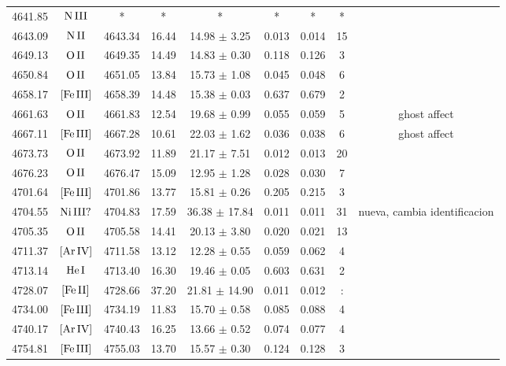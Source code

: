 \documentclass{article}
\begin{document}
\begin{table*}
\begin{adjustbox}{width=\textwidth}
\begin{tabular}{ccccccccc}
4641.85 & $\mbox{N}\thinspace \mbox{III}$ & * & * & * & * & * & * &  \\
4643.09 & $\mbox{N}\thinspace \mbox{II}$ & 4643.34 & 16.44 & 14.98 $\pm$ 3.25 & 0.013 & 0.014 & 15 &  \\
4649.13 & $\mbox{O}\thinspace \mbox{II}$ & 4649.35 & 14.49 & 14.83 $\pm$ 0.30 & 0.118 & 0.126 & 3 &  \\
4650.84 & $\mbox{O}\thinspace \mbox{II}$ & 4651.05 & 13.84 & 15.73 $\pm$ 1.08 & 0.045 & 0.048 & 6 &  \\
4658.17 & $\mbox{[Fe}\thinspace \mbox{III]}$ & 4658.39 & 14.48 & 15.38 $\pm$ 0.03 & 0.637 & 0.679 & 2 &  \\
4661.63 & $\mbox{O}\thinspace \mbox{II}$ & 4661.83 & 12.54 & 19.68 $\pm$ 0.99 & 0.055 & 0.059 & 5 &  ghost affect \\
4667.11 & $\mbox{[Fe}\thinspace \mbox{III]}$ & 4667.28 & 10.61 & 22.03 $\pm$ 1.62 & 0.036 & 0.038 & 6 &  ghost affect \\
4673.73 & $\mbox{O}\thinspace \mbox{II}$ & 4673.92 & 11.89 & 21.17 $\pm$ 7.51 & 0.012 & 0.013 & 20 &  \\
4676.23 & $\mbox{O}\thinspace \mbox{II}$ & 4676.47 & 15.09 & 12.95 $\pm$ 1.28 & 0.028 & 0.030 & 7 &  \\
4701.64 & $\mbox{[Fe}\thinspace \mbox{III]}$ & 4701.86 & 13.77 & 15.81 $\pm$ 0.26 & 0.205 & 0.215 & 3 &  \\
4704.55 & $\mbox{Ni}\thinspace \mbox{III?}$ & 4704.83 & 17.59 & 36.38 $\pm$ 17.84 & 0.011 & 0.011 & 31 &  nueva, cambia identificacion \\
4705.35 & $\mbox{O}\thinspace \mbox{II}$ & 4705.58 & 14.41 & 20.13 $\pm$ 3.80 & 0.020 & 0.021 & 13 &  \\
4711.37 & $\mbox{[Ar}\thinspace \mbox{IV]}$ & 4711.58 & 13.12 & 12.28 $\pm$ 0.55 & 0.059 & 0.062 & 4 &  \\
4713.14 & $\mbox{He}\thinspace \mbox{I}$ & 4713.40 & 16.30 & 19.46 $\pm$ 0.05 & 0.603 & 0.631 & 2 &  \\
4728.07 & $\mbox{[Fe}\thinspace \mbox{II]}$ & 4728.66 & 37.20 & 21.81 $\pm$ 14.90 & 0.011 & 0.012 & : &  \\
4734.00 & $\mbox{[Fe}\thinspace \mbox{III]}$ & 4734.19 & 11.83 & 15.70 $\pm$ 0.58 & 0.085 & 0.088 & 4 &  \\
4740.17 & $\mbox{[Ar}\thinspace \mbox{IV]}$ & 4740.43 & 16.25 & 13.66 $\pm$ 0.52 & 0.074 & 0.077 & 4 &  \\
4754.81 & $\mbox{[Fe}\thinspace \mbox{III]}$ & 4755.03 & 13.70 & 15.57 $\pm$ 0.30 & 0.124 & 0.128 & 3 &  \\

\end{tabular}
\end{adjustbox}
\end{table*}
\end{document}
